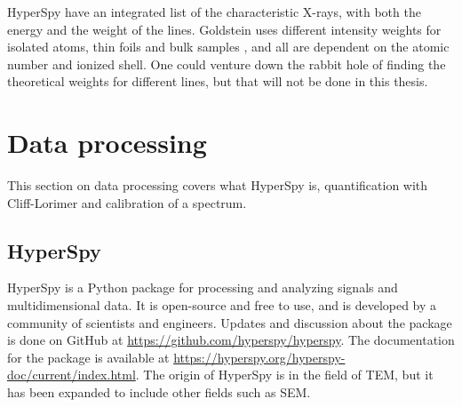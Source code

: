 







HyperSpy have an integrated list of the characteristic X-rays, with both the energy and the weight of the lines.
Goldstein uses different intensity weights for isolated atoms, thin foils and bulk samples \cite[Ch. 4.2.6]{goldstein_scanning_2018}, and all are dependent on the atomic number and ionized shell.
One could venture down the rabbit hole of finding the theoretical weights for different lines, but that will not be done in this thesis.














\section{Data processing}
\label{sec:theory:data}

This section on data processing covers what HyperSpy is, quantification with Cliff-Lorimer and calibration of a spectrum.






\subsection{HyperSpy}
\label{sec:theory:data:hyperspy}


HyperSpy is a Python package for processing and analyzing signals and multidimensional data.
It is open-source and free to use, and is developed by a community of scientists and engineers.
Updates and discussion about the package is done on GitHub at \url{https://github.com/hyperspy/hyperspy}.
The documentation for the package is available at \url{https://hyperspy.org/hyperspy-doc/current/index.html}.
The origin of HyperSpy is in the field of TEM, but it has been expanded to include other fields such as SEM.

